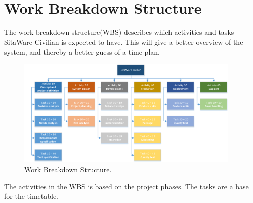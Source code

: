 \chapter{Work Breakdown Structure}
\label{chap:wbs}

The work breakdown structure(WBS) describes which activities and tasks SitaWare Civilian is expected to have. This will give a better overview of the system, and thereby a better guess of a time plan.

\begin{figure}[H]
\centering
\includegraphics[width=0.95\textwidth]
{Billeder/WBS/WBS_v1.0.pdf}
\caption{Work Breakdown Structure.}
\label{fig:WBS}
\end{figure}

The activities in the WBS is based on the project phases. The tasks are a base for the timetable.

